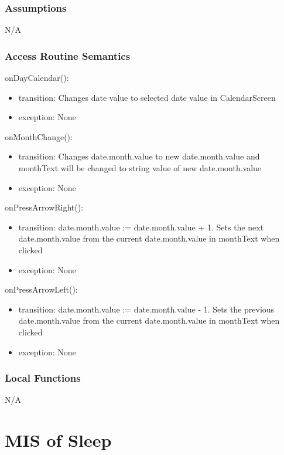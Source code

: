 \documentclass[12pt, titlepage]{article}
\begin{document}
\subsubsection{Assumptions}

N/A

\subsubsection{Access Routine Semantics}

\noindent onDayCalendar():
\begin{itemize}
	\item transition: Changes date value to selected date value in CalendarScreen 
	\item exception: None
\end{itemize}

\noindent onMonthChange():
\begin{itemize}
	\item transition: Changes date.month.value to new date.month.value and monthText will be changed to string value of new date.month.value
	\item exception: None 
\end{itemize}

\noindent onPressArrowRight():
\begin{itemize}
	\item transition: date.month.value := date.month.value + 1. Sets the next date.month.value from the current date.month.value in monthText when clicked
	\item exception: None 
\end{itemize}

\noindent onPressArrowLeft():
\begin{itemize}
	\item transition: date.month.value := date.month.value - 1. Sets the previous date.month.value from the current date.month.value in monthText when clicked
	\item exception: None 
\end{itemize}

\subsubsection{Local Functions}

N/A

\section{MIS of Sleep} \label{Module} 
\end{document}
